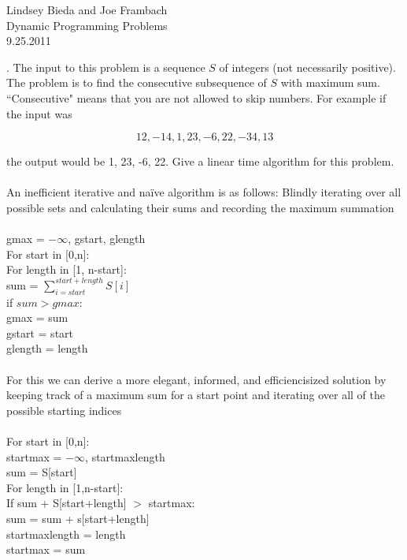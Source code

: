 \documentclass[10pt]{article}
\newcommand{\tab}{\hspace*{2em}}
\newcommand{\tabb}{\hspace*{4em}}
\newcommand{\tabbb}{\hspace*{6em}}
\begin{document}
	\begin{flushright}
	Lindsey Bieda and Joe Frambach\\
	Dynamic Programming Problems\\
	9.25.2011
	\end{flushright}
	.  The input to this problem is a sequence $S$ of integers (not necessarily positive). The problem is to find
			the consecutive subsequence of $S$ with maximum sum. ``Consecutive" means that you are not allowed
			to skip numbers. For example if the input was
			
			\[ 12, -14, 1, 23, -6, 22, -34, 13 \]
			
			\noindent
			the output would be 1, 23, -6, 22. Give a linear time algorithm for this problem.\\
			\\
			An inefficient iterative and na\"{i}ve algorithm is as follows: Blindly iterating over all possible sets and calculating their sums and recording the maximum summation\\
			\\
			gmax = $-\infty$, gstart, glength\\
			For start in [0,n]:\\
			\tab For length in [1, n-start]:\\
			\tabb sum = $\sum_{i=start}^{start+length} S[i]$\\
			\tabb if $sum > gmax:$\\
			\tabbb gmax = sum\\
			\tabbb gstart = start\\
			\tabbb glength = length\\
			\\
			For this we can derive a more elegant, informed, and efficiencisized solution by keeping track of a maximum sum for a start point and iterating over all of the possible starting indices\\
			\\
			For start in [0,n]:\\
			\tab startmax = $-\infty$, startmaxlength\\
			\tab sum = S[start]\\
			\tab For length in [1,n-start]:\\
			\tabb If sum + S[start+length] $>$ startmax:\\
			\tabbb sum = sum + s[start+length]\\
			\tabbb startmaxlength = length\\
			\tabbb startmax = sum\\
\end{document}
